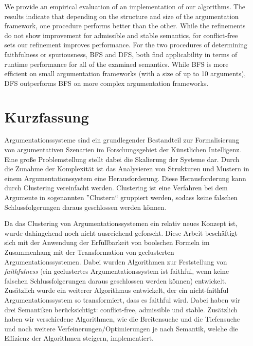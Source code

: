 \documentclass[twoside,openright]{scrreprt}
\begin{document}
We provide an empirical evaluation of an implementation of our algorithms. The results indicate that depending on the structure and size of the argumentation framework, one procedure performs better than the other. While the refinements do not show improvement for admissible and stable semantics, for conflict-free sets our refinement improves performance. For the two procedures of determining faithfulness or spuriousness, BFS and DFS, both find applicability in terms of runtime performance for all of the examined semantics. While BFS is more efficient on small argumentation frameworks (with a size of up to 10 arguments), DFS outperforms BFS on more complex argumentation frameworks.







\chapter*{Kurzfassung}

Argumentationssysteme sind ein grundlegender Bestandteil zur Formalisierung von argumentativen Szenarien im Forschungsgebiet der Künstlichen Intelligenz. Eine große Problemstellung stellt dabei die Skalierung der Systeme dar. Durch die Zunahme der Komplexität ist das Analysieren von Strukturen und Mustern in einem Argumentationssystem eine Herausforderung. Diese Herausforderung kann durch Clustering vereinfacht werden. Clustering ist eine Verfahren bei dem Argumente in sogenannten ''Clustern`` gruppiert werden, sodass keine falschen Schlussfolgerungen daraus geschlossen werden können.

Da das Clustering von Argumentationssystemen ein relativ neues Konzept ist, wurde dahingehend noch nicht ausreichend geforscht. Diese Arbeit beschäftigt sich mit der Anwendung der Erfüllbarkeit von boolschen Formeln im Zusammenhang mit der Transformation von geclusterten Argumentationssystemen. Dabei wurden Algorithmen zur Feststellung von \emph{faithfulness} (ein geclustertes Argumentationssystem ist faithful, wenn keine falschen Schlussfolgerungen daraus geschlossen werden können) entwickelt. Zusätzlich wurde ein weiterer Algorithmus entwickelt, der ein nicht-faithful Argumentationssystem so transformiert, dass es faithful wird. Dabei haben wir drei Semantiken berücksichtigt: conflict-free, admissible und stable. Zusätzlich haben wir verschiedene Algorithmen, wie die Breitensuche und die Tiefensuche und noch weitere Verfeinerungen/Optimierungen je nach Semantik, welche die Effizienz der Algorithmen steigern, implementiert.
\end{document}
